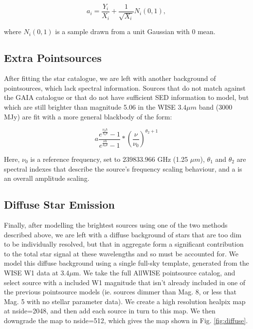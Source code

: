 \documentclass{aa}
\begin{document}
\begin{equation}
a_i = \frac{Y_i}{X_i} + \frac{1}{\sqrt{X_i}} N_i(0,1),
\end{equation}

where $N_i(0,1)$ is a sample drawn from a unit Gaussian with 0 mean.

\subsection{Extra Pointsources}

\label{sec:extragalacticmodel}

After fitting the star catalogue, we are left with another background of pointsources, which lack spectral information. Sources that do not match against the GAIA catalogue or that do not have sufficient SED information to model, but which are still brighter than magnitude 5.06 in the WISE $3.4 \mu m$ band ($3000$ MJy) are fit with a more general blackbody of the form:

\begin{equation}
a \frac{e^{\frac{\nu_0 h}{k_b \theta}} - 1}{e^{\frac{\nu h}{k_b \theta}} - 1} * (\frac{\nu}{\nu_0})^{\theta_2 + 1}
\end{equation}

Here, $\nu_0$ is a reference frequency, set to $239833.966$ GHz (1.25 $\mu m$), $\theta_1$ and $\theta_2$ are spectral indexes that describe the source's frequency scaling behaviour, and a is an overall amplitude scaling. 



\subsection{Diffuse Star Emission}

\label{sec:diffusemodel}

Finally, after modelling the brightest sources using one of the two methods described above, we are left with a diffuse background of stars that are too dim to be individually resolved, but that in aggregate form a significant contribution to the total star signal at these wavelengths and so must be accounted for. We model this diffuse background using a single full-sky template, generated from the WISE W1 data at 3.4$\mu$m. We take the full AllWISE pointsource catalog, and select source with a included W1 magnitude that isn't already included in one of the previous pointsource models (ie. sources dimmer than Mag. 8, or less that Mag. 5 with no stellar parameter data). We create a high resolution healpix map \citep{healpix} at nside=2048, and then add each source in turn to this map. We then downgrade the map to nside=512, which gives the map shown in Fig. \ref{fig:diffuse}. 
\end{document}

